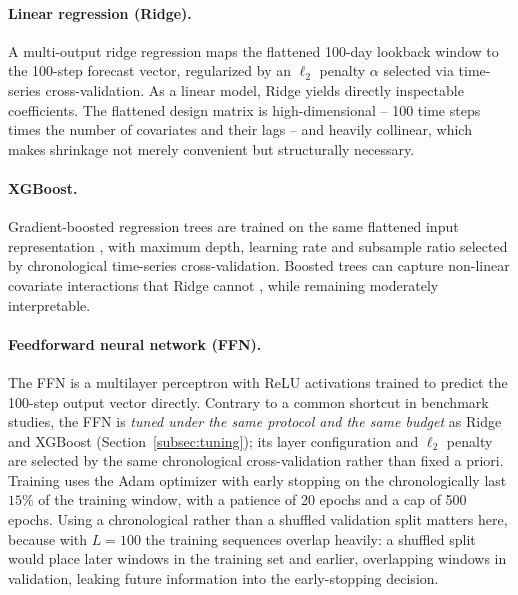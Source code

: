 \documentclass[11pt,a4paper]{article}
\begin{document}
\paragraph{Linear regression (Ridge).}
A multi-output ridge regression maps the flattened 100-day lookback window to
the 100-step forecast vector, regularized by an $\ell_2$ penalty $\alpha$
selected via time-series cross-validation. As a linear model, Ridge yields
directly inspectable coefficients. The flattened design matrix is
high-dimensional -- 100 time steps times the number of covariates and their
lags -- and heavily collinear, which makes shrinkage not merely convenient but
structurally necessary.

\paragraph{XGBoost.}
Gradient-boosted regression trees are trained on the same flattened input
representation \citep{chen2016}, with maximum depth, learning rate and
subsample ratio selected by chronological time-series cross-validation.
Boosted trees can capture non-linear covariate interactions that Ridge cannot
\citep[Ch.~10]{hastie2009}, while remaining moderately interpretable.

\paragraph{Feedforward neural network (FFN).}
The FFN is a multilayer perceptron with ReLU activations trained to predict
the 100-step output vector directly. Contrary to a common shortcut in
benchmark studies, the FFN is \emph{tuned under the same protocol and the same
budget} as Ridge and XGBoost (Section~\ref{subsec:tuning}); its layer
configuration and $\ell_2$ penalty are selected by the same chronological
cross-validation rather than fixed a priori. Training uses the Adam optimizer
with early stopping on the chronologically last $15\%$ of the training window,
with a patience of 20 epochs and a cap of 500 epochs. Using a chronological
rather than a shuffled validation split matters here, because with $L=100$ the
training sequences overlap heavily: a shuffled split would place later windows
in the training set and earlier, overlapping windows in validation, leaking
future information into the early-stopping decision.
\end{document}
